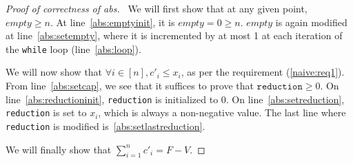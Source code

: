 \begin{proof}[Proof of correctness of abs] \
  We will first show that at any given point, $empty \geq n$. At line~\ref{abs:emptyinit}, it is $empty = 0 \geq n$. $empty$
  is again modified at line~\ref{abs:setempty}, where it is incremented by at most 1 at each iteration of the \texttt{while}
  loop (line~\ref{abs:loop}).

  We will now show that $\forall i \in [n], c'_i \leq x_i$, as per the requirement (\ref{naive:req1}). From
  line~\ref{abs:setcap}, we see that it suffices to prove that $\texttt{reduction} \geq 0$. On line~\ref{abs:reductioninit},
  \texttt{reduction} is initialized to 0. On line~\ref{abs:setreduction}, \texttt{reduction} is set to $x_i$, which is always
  a non-negative value. The last line where \texttt{reduction} is modified is~\ref{abs:setlastreduction}.

  We will finally show that $\sum\limits_{i=1}^nc'_i = F - V$.
\end{proof}
